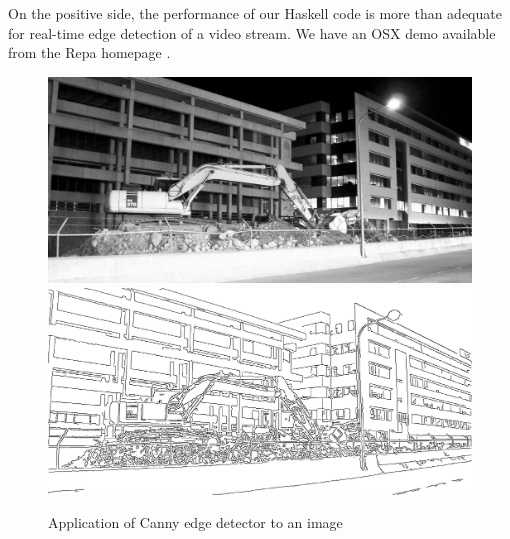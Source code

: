 On the positive side, the performance of our Haskell code is more than adequate for real-time edge detection of a video stream. We have an OSX demo available from the Repa homepage \cite{RepaHomePage}. 


\begin{figure}
\begin{center}
\includegraphics[scale=0.2]{figs/digger-grey-qual80.eps}
\includegraphics[scale=0.2]{figs/digger-edges.eps}
\vspace{-0.5em}
\end{center}
\caption{Application of Canny edge detector to an image}
\label{fig:CannyExample}
\end{figure}


